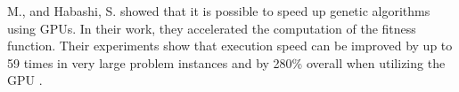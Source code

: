 M., and Habashi, S. showed that it is possible to speed up genetic algorithms using GPUs. In their work, they accelerated the computation of the fitness function. Their experiments show that execution speed can be improved by up to 59 times in very large problem instances and by 280\% overall when utilizing the GPU \cite{yousef-gpu-ga}.


%
%
%
%
%